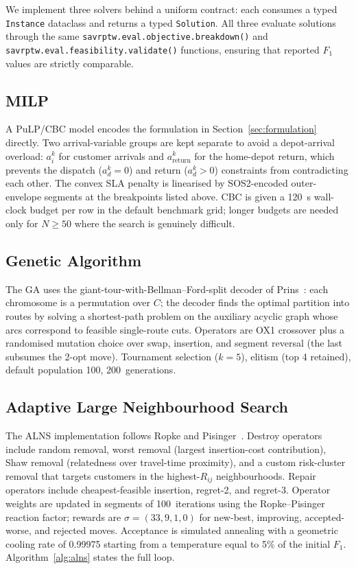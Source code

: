 \documentclass{ieeeaccess}
\begin{document}
We implement three solvers behind a uniform contract: each consumes a
typed \texttt{Instance} dataclass and returns a typed \texttt{Solution}.
All three evaluate solutions through the same
\texttt{savrptw.eval.objective.breakdown()} and
\texttt{savrptw.eval.feasibility.validate()} functions, ensuring that
reported $F_1$ values are strictly comparable.

\subsection{MILP}
A PuLP/CBC model encodes the formulation in
Section~\ref{sec:formulation} directly. Two arrival-variable groups
are kept separate to avoid a depot-arrival overload: $a_i^k$ for
customer arrivals and $a_{\text{return}}^k$ for the home-depot return,
which prevents the dispatch ($a_d^k = 0$) and return ($a_d^k > 0$)
constraints from contradicting each other. The convex SLA penalty is
linearised by SOS2-encoded outer-envelope segments at the breakpoints
listed above. CBC is given a 120~s wall-clock budget per row in the
default benchmark grid; longer budgets are needed only for $N \geq 50$
where the search is genuinely difficult.

\subsection{Genetic Algorithm}
The GA uses the giant-tour-with-Bellman--Ford-split decoder of
Prins~\cite{prins2004}: each chromosome is a permutation over $C$;
the decoder finds the optimal partition into routes by solving a
shortest-path problem on the auxiliary acyclic graph whose arcs
correspond to feasible single-route cuts. Operators are OX1 crossover
plus a randomised mutation choice over swap, insertion, and segment
reversal (the last subsumes the 2-opt move). Tournament selection
($k = 5$), elitism (top 4 retained), default population 100,
200~generations.

\subsection{Adaptive Large Neighbourhood Search}
The ALNS implementation follows
Ropke and Pisinger~\cite{ropke2006}. Destroy operators include random
removal, worst removal (largest insertion-cost contribution), Shaw
removal (relatedness over travel-time proximity), and a custom
risk-cluster removal that targets customers in the highest-$R_{ij}$
neighbourhoods. Repair operators include cheapest-feasible insertion,
regret-2, and regret-3. Operator weights are updated in segments of
100~iterations using the Ropke--Pisinger reaction factor; rewards
are $\sigma = (33, 9, 1, 0)$ for new-best, improving, accepted-worse,
and rejected moves. Acceptance is simulated annealing with a
geometric cooling rate of 0.99975 starting from a temperature equal
to 5\% of the initial $F_1$. Algorithm~\ref{alg:alns} states the full
loop.
\end{document}
